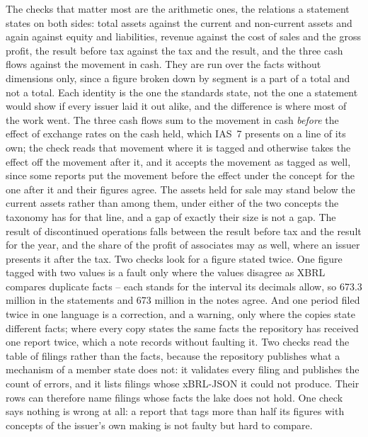 The checks that matter most are the arithmetic ones, the relations a statement states on both sides: total assets against the current and non-current assets and again against equity and liabilities, revenue against the cost of sales and the gross profit, the result before tax against the tax and the result, and the three cash flows against the movement in cash. They are run over the facts without dimensions only, since a figure broken down by segment is a part of a total and not a total. Each identity is the one the standards state, not the one a statement would show if every issuer laid it out alike, and the difference is where most of the work went. The three cash flows sum to the movement in cash \emph{before} the effect of exchange rates on the cash held, which IAS~7 presents on a line of its own; the check reads that movement where it is tagged and otherwise takes the effect off the movement after it, and it accepts the movement as tagged as well, since some reports put the movement before the effect under the concept for the one after it and their figures agree. The assets held for sale may stand below the current assets rather than among them, under either of the two concepts the taxonomy has for that line, and a gap of exactly their size is not a gap. The result of discontinued operations falls between the result before tax and the result for the year, and the share of the profit of associates may as well, where an issuer presents it after the tax. Two checks look for a figure stated twice. One figure tagged with two values is a fault only where the values disagree as XBRL compares duplicate facts -- each stands for the interval its decimals allow, so 673.3 million in the statements and 673 million in the notes agree. And one period filed twice in one language is a correction, and a warning, only where the copies state different facts; where every copy states the same facts the repository has received one report twice, which a note records without faulting it. Two checks read the table of filings rather than the facts, because the repository publishes what a mechanism of a member state does not: it validates every filing and publishes the count of errors, and it lists filings whose xBRL-JSON it could not produce. Their rows can therefore name filings whose facts the lake does not hold. One check says nothing is wrong at all: a report that tags more than half its figures with concepts of the issuer's own making is not faulty but hard to compare.

